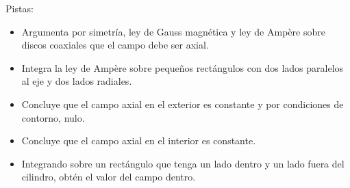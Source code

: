 \documentclass{exam}
\begin{document}
\begin{questions}
    Pistas:
    \begin{itemize}
    \item Argumenta por simetría, ley de Gauss magnética y ley de
      Ampère sobre discos coaxiales que el campo debe ser axial.
    \item Integra la ley de Ampère sobre pequeños rectángulos con dos
      lados paralelos al eje y dos lados radiales.
    \item Concluye que el campo axial en el exterior es constante y
      por condiciones de contorno, nulo.
    \item Concluye que el campo axial en el interior es constante.
    \item Integrando sobre un rectángulo que tenga un lado dentro y un
      lado fuera del cilindro, obtén el valor del campo dentro.
    \end{itemize}



  \end{questions}
\end{document}
